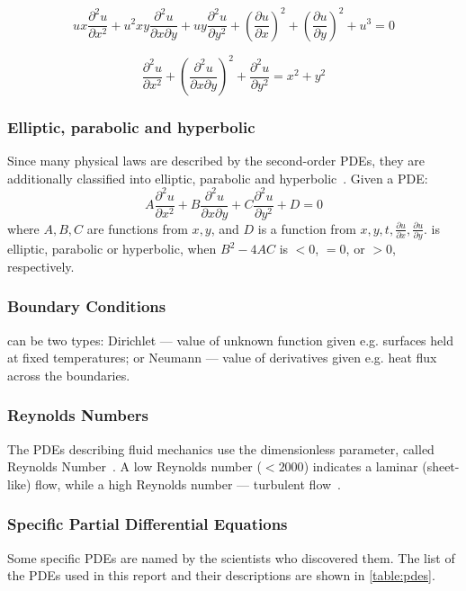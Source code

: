 \begin{equation}
u x \frac{\partial^{2} u}{\partial x^{2}}+u^{2} x y \frac{\partial^{2} u}{\partial x \partial y}+u y \frac{\partial^{2} u}{\partial y^{2}}+\left(\frac{\partial u}{\partial x}\right)^{2}+\left(\frac{\partial u}{\partial y}\right)^{2}+u^{3}=0
\label{eq:quasilinpde}
\end{equation}

\begin{equation}
\frac{\partial^{2} u}{\partial x^{2}}+\left(\frac{\partial^{2} u}{\partial x \partial y}\right)^{2}+\frac{\partial^{2} u}{\partial y^{2}}=x^{2}+y^{2}
\label{eq:nonlinpdeex}
\end{equation}

\subsubsection{Elliptic, parabolic and hyperbolic} Since many physical laws are described by the second-order PDEs, they are additionally classified into elliptic, parabolic and hyperbolic~\cite{pdevideo}. Given a PDE:
\begin{equation}
A \frac{\partial^{2} u}{\partial x^{2}}+B \frac{\partial^{2} u}{\partial x \partial y}+C \frac{\partial^{2} u}{\partial y^{2}}+D=0
\label{eq:pde}
\end{equation}
where $A, B, C$ are functions from $x, y$, and $D$ is a function from $x, y, t, \frac{\partial u}{\partial x}, \frac{\partial u}{\partial y}$.  is elliptic, parabolic or hyperbolic, when $B^2 - 4AC$ is $< 0$, $= 0$, or $> 0$, respectively.

\subsubsection{Boundary Conditions} can be two types: Dirichlet --- value of unknown function given e.g. surfaces held at fixed temperatures; or Neumann --- value of derivatives given e.g. heat flux across the boundaries.

\subsubsection{Reynolds Numbers} The PDEs describing fluid mechanics use the dimensionless parameter, called Reynolds Number~\cite{reynoldsnumber2}. A low Reynolds number ($< 2000$) indicates a laminar (sheet-like) flow, while a high Reynolds number --- turbulent flow~\cite{reynoldsnumber}.

\subsubsection{Specific Partial Differential Equations}
Some specific PDEs are named by the scientists who discovered them. The list of the PDEs used in this report and their descriptions are shown in \cref{table:pdes}.

